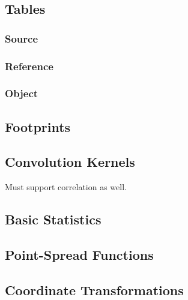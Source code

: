 \subsection{Tables}
\label{sec:spTables}

\subsubsection{Source}
\label{sec:spTablesSource}

\subsubsection{Reference}
\label{sec:spTablesReference}

\subsubsection{Object}
\label{sec:spTablesObject}

\subsection{Footprints}
\label{sec:spFootprints}

\subsection{Convolution Kernels}
\label{sec:spKernels}
Must support correlation as well.

\subsection{Basic Statistics}
\label{sec:spStatistics}

\subsection{Point-Spread Functions}
\label{sec:spPSF}

\subsection{Coordinate Transformations}
\label{sec:spWCS}

